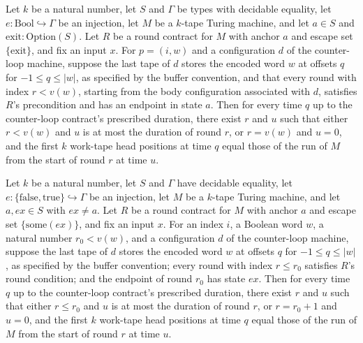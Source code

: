\begin{theorem}
\label{Turing.RoundContract.counterLoopDone_traj}
\leanok
{}
Let $k$ be a natural number, let $S$ and $\Gamma$ be types with decidable equality, let
$e:\mathrm{Bool}\hookrightarrow\Gamma$ be an injection, let $M$ be a
$k$-tape Turing machine, and let $a\in S$ and $\mathrm{exit}:\mathrm{Option}(S)$. Let
$R$ be a round contract for $M$ with anchor $a$ and escape set $\{\mathrm{exit}\}$, and
fix an input $x$. For $p=(i,w)$ and a configuration $d$ of the counter-loop machine,
suppose the last tape of $d$ stores the encoded word $w$ at offsets $q$ for $-1\le q\le
|w|$, as specified by the buffer convention, and that every round with index $r< v(w)$,
starting from the body configuration associated with $d$, satisfies $R$'s precondition
and has an endpoint in state $a$. Then for every time $q$ up to the counter-loop
contract's prescribed duration, there exist $r$ and $u$ such that either $r<v(w)$ and
$u$ is at most the duration of round $r$, or $r=v(w)$ and $u=0$, and the first $k$
work-tape head positions at time $q$ equal those of the run of $M$ from the start of
round $r$ at time $u$.
\end{theorem}

\begin{theorem}
\label{Turing.RoundContract.counterLoopEscape_traj}
\leanok
{}
Let $k$ be a natural number, let $S$ and $\Gamma$ have decidable equality, let
$e:\{\mathrm{false},\mathrm{true}\}\hookrightarrow\Gamma$ be an injection, let $M$ be a
$k$-tape Turing machine, and let $a,ex\in S$ with $ex\ne a$. Let $R$ be a round contract
for $M$ with anchor $a$ and escape set $\{\mathrm{some}(ex)\}$, and fix an input $x$.
For an index $i$, a Boolean word $w$, a natural number $r_0<v(w)$, and a configuration
$d$ of the counter-loop machine, suppose the last tape of $d$ stores the encoded word
$w$ at offsets $q$ for $-1\le q\le |w|$, as specified by the buffer convention; every
round with index $r\le r_0$ satisfies $R$'s round condition; and the endpoint of round
$r_0$ has state $ex$. Then for every time $q$ up to the counter-loop contract's
prescribed duration, there exist $r$ and $u$ such that either $r\le r_0$ and $u$ is at
most the duration of round $r$, or $r=r_0+1$ and $u=0$, and the first $k$ work-tape head
positions at time $q$ equal those of the run of $M$ from the start of round $r$ at time
$u$.
\end{theorem}
